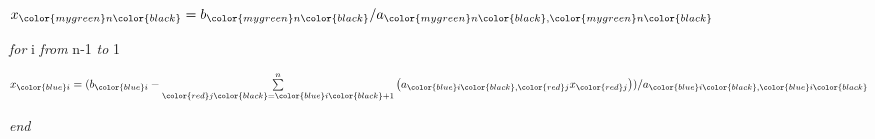 \documentclass[fleqn]{beamer} %
\begin{document}
{\begin{multicols}{2}
				$x_{\color{mygreen}n\color{black}}=b_{\color{mygreen}n\color{black}}/a_{\color{mygreen}n\color{black},\color{mygreen}n\color{black}}$ \vspace{2mm}
				
		{\it for} \color{blue}i \color{black} {\it from} \color{mygreen}n\color{black}-1 {\it to} 1 \vspace{4mm}
	
		\hspace*{10mm}$x_{\color{blue}i}=(b_{\color{blue}i}-\sum\limits^n_{\color{red}j\color{black}=\color{blue}i\color{black}+1}\left( a_{\color{blue}i\color{black},\color{red}j}x_{\color{red}j}\right)) /a_{\color{blue}i\color{black},\color{blue}i\color{black}}$	\vspace{2mm}
		
		{\it end} \vspace{2mm}
		
		\end{multicols}
}
\end{document}
